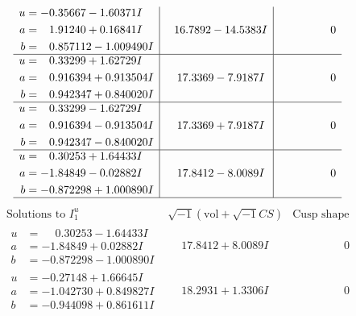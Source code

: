 \documentclass[1p]{elsarticle_modified}
\theoremstyle{definition}
\newcommand{\I}{\sqrt{-1}}
\begin{document}
$$\begin{array}{c|c|c}
\begin{aligned}
u &= -0.35667 - 1.60371 I \\
a &= \phantom{-}1.91240 + 0.16841 I \\
b &= \phantom{-}0.857112 - 1.009490 I\end{aligned}
 & \phantom{-}16.7892 - 14.5383 I & \phantom{-0.000000 } 0 \\ \hline\begin{aligned}
u &= \phantom{-}0.33299 + 1.62729 I \\
a &= \phantom{-}0.916394 + 0.913504 I \\
b &= \phantom{-}0.942347 + 0.840020 I\end{aligned}
 & \phantom{-}17.3369 - 7.9187 I & \phantom{-0.000000 } 0 \\ \hline\begin{aligned}
u &= \phantom{-}0.33299 - 1.62729 I \\
a &= \phantom{-}0.916394 - 0.913504 I \\
b &= \phantom{-}0.942347 - 0.840020 I\end{aligned}
 & \phantom{-}17.3369 + 7.9187 I & \phantom{-0.000000 } 0 \\ \hline\begin{aligned}
u &= \phantom{-}0.30253 + 1.64433 I \\
a &= -1.84849 - 0.02882 I \\
b &= -0.872298 + 1.000890 I\end{aligned}
 & \phantom{-}17.8412 - 8.0089 I & \phantom{-0.000000 } 0\\
 \hline 
 \end{array}$$\newpage$$\begin{array}{c|c|c}  
\text{Solutions to }I^u_{1}& \I (\text{vol} + \sqrt{-1}CS) & \text{Cusp shape}\\
 \hline 
\begin{aligned}
u &= \phantom{-}0.30253 - 1.64433 I \\
a &= -1.84849 + 0.02882 I \\
b &= -0.872298 - 1.000890 I\end{aligned}
 & \phantom{-}17.8412 + 8.0089 I & \phantom{-0.000000 } 0 \\ \hline\begin{aligned}
u &= -0.27148 + 1.66645 I \\
a &= -1.042730 + 0.849827 I \\
b &= -0.944098 + 0.861611 I\end{aligned}
 & \phantom{-}18.2931 + 1.3306 I & \phantom{-0.000000 } 0 \\ \hline\begin{aligned}

\end{aligned}
\end{array}$$
\end{document}
